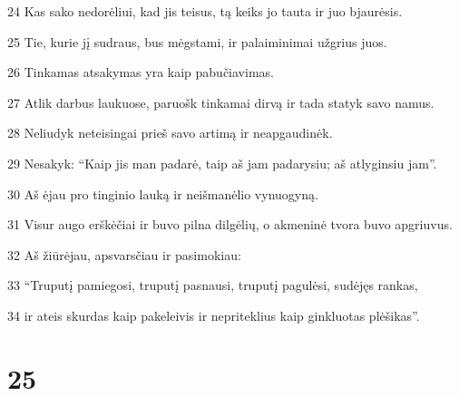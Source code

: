 \par 24 Kas sako nedorėliui, kad jis teisus, tą keiks jo tauta ir juo bjaurėsis. 
\par 25 Tie, kurie jį sudraus, bus mėgstami, ir palaiminimai užgrius juos. 
\par 26 Tinkamas atsakymas yra kaip pabučiavimas. 
\par 27 Atlik darbus laukuose, paruošk tinkamai dirvą ir tada statyk savo namus. 
\par 28 Neliudyk neteisingai prieš savo artimą ir neapgaudinėk. 
\par 29 Nesakyk: “Kaip jis man padarė, taip aš jam padarysiu; aš atlyginsiu jam”. 
\par 30 Aš ėjau pro tinginio lauką ir neišmanėlio vynuogyną. 
\par 31 Visur augo erškėčiai ir buvo pilna dilgėlių, o akmeninė tvora buvo apgriuvus. 
\par 32 Aš žiūrėjau, apsvarsčiau ir pasimokiau: 
\par 33 “Truputį pamiegosi, truputį pasnausi, truputį pagulėsi, sudėjęs rankas, 
\par 34 ir ateis skurdas kaip pakeleivis ir nepriteklius kaip ginkluotas plėšikas”.



\chapter{25}


